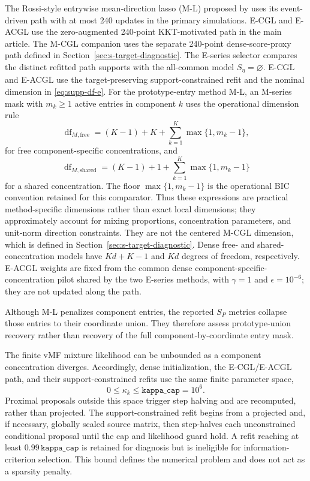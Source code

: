 \documentclass[preprint,12pt,authoryear]{elsarticle}
\begin{document}
The Rossi-style entrywise mean-direction lasso (M-L) proposed by
\citet{rossi2022sparsevmf} uses its event-driven path with at most 240 updates
in the primary simulations. E-CGL and E-ACGL use the zero-augmented 240-point
KKT-motivated path in the main article. The M-CGL companion uses the separate
240-point dense-score-proxy path defined in
Section~\ref{sec:s-target-diagnostic}. The E-series selector compares the distinct
refitted path supports with the all-common model
$S_\eta=\varnothing$. E-CGL and E-ACGL use the target-preserving
support-constrained refit and the nominal dimension in
\eqref{eq:supp-df-e}.
For the prototype-entry method M-L, an M-series mask with
$m_k\geq1$ active entries in component $k$ uses the operational dimension rule
\[
\operatorname{df}_{M,\mathrm{free}}
=(K-1)+K+\sum_{k=1}^K\max\{1,m_k-1\},
\]
for free component-specific concentrations, and
\[
\operatorname{df}_{M,\mathrm{shared}}
=(K-1)+1+\sum_{k=1}^K\max\{1,m_k-1\}
\]
for a shared concentration. The floor $\max\{1,m_k-1\}$ is the operational
BIC convention retained for this comparator. Thus these expressions are
practical method-specific dimensions rather than exact local dimensions;
they approximately account for mixing proportions, concentration parameters,
and unit-norm direction constraints.
They are not the centered M-CGL dimension, which is defined in
Section~\ref{sec:s-target-diagnostic}. Dense free- and shared-concentration
models have $Kd+K-1$ and $Kd$ degrees of freedom, respectively. E-ACGL weights
are fixed from the common dense component-specific-concentration pilot shared
by the two E-series methods, with $\gamma=1$ and $\epsilon=10^{-6}$; they are
not updated along the path.

Although M-L penalizes component entries, the reported $S_P$ metrics collapse
those entries to their coordinate union. They therefore assess
prototype-union recovery rather than recovery of the full component-by-coordinate
entry mask.

The finite vMF mixture likelihood can be unbounded as a component
concentration diverges.
Accordingly, dense initialization, the E-CGL/E-ACGL path, and their
support-constrained refits use the same finite parameter space,
\[
0\leq\kappa_k\leq\texttt{kappa\_cap}=10^6.
\]
Proximal proposals outside this space trigger step halving and are recomputed,
rather than projected. The support-constrained refit begins from a projected
and, if necessary, globally scaled source matrix, then step-halves each
unconstrained conditional proposal until the cap and likelihood guard hold. A
refit reaching at least
$0.99\,\texttt{kappa\_cap}$ is retained for diagnosis but is ineligible for
information-criterion selection. This bound defines the numerical problem and
does not act as a sparsity penalty.
\end{document}
